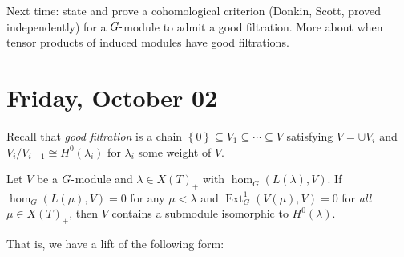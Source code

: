 Next time: state and prove a cohomological criterion (Donkin, Scott,
proved independently) for a \(G{\hbox{-}}\)module to admit a good
filtration. More about when tensor products of induced modules have good
filtrations.

\hypertarget{friday-october-02}{%
\section{Friday, October 02}\label{friday-october-02}}

Recall that \emph{good filtration} is a chain
\(\left\{{0}\right\} \subseteq V_1 \subseteq \cdots \subseteq V\)
satisfying \(V = \cup V_i\) and \(V_i/V_{i-1} \cong H^0(\lambda_i)\) for
\(\lambda_i\) some weight of \(V\).

\begin{lemma}[?]

Let \(V\) be a \(G{\hbox{-}}\)module and \(\lambda \in X(T)_+\) with
\(\hom_G(L(\lambda), V)\). If \(\hom_G(L(\mu), V) = 0\) for any
\(\mu < \lambda\) and \(\operatorname{Ext}_G^1(V(\mu), V) = 0\) for
\emph{all} \(\mu \in X(T)_+\), then \(V\) contains a submodule
isomorphic to \(H^0(\lambda)\).

\end{lemma}

That is, we have a lift of the following form:

\begin{center}
\end{center}


